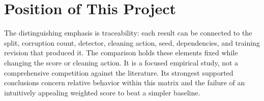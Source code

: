 \section{Position of This Project}
The distinguishing emphasis is traceability: each result can be connected to
the split, corruption count, detector, cleaning action, seed, dependencies,
and training revision that produced it. The comparison holds these elements
fixed while changing the score or cleaning action. It is a focused empirical
study, not a comprehensive competition against the literature. Its strongest
supported conclusions concern relative behavior within this matrix and the
failure of an intuitively appealing weighted score to beat a simpler baseline.

